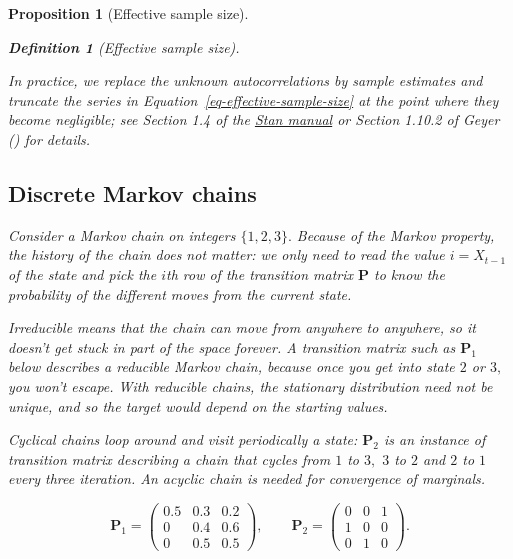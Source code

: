 \documentclass[
  11pt,
  letterpaper,
]{scrbook}
\theoremstyle{definition}
\theoremstyle{plain}
\newtheorem{proposition}{Proposition}[chapter]
\theoremstyle{plain}
\theoremstyle{plain}
\theoremstyle{definition}
\theoremstyle{definition}
\newtheorem{definition}{Definition}[chapter]
\theoremstyle{plain}
\newtheorem{proposition}{Proposition}[chapter]
\theoremstyle{plain}
\theoremstyle{remark}
\begin{document}
\begin{proposition}[Effective sample
size]
\begin{definition}[Effective sample
size]
\end{definition}

In practice, we replace the unknown autocorrelations by sample estimates
and truncate the series in Equation~\ref{eq-effective-sample-size} at
the point where they become negligible; see Section 1.4 of the
\href{https://mc-stan.org/docs/reference-manual/effective-sample-size.html}{Stan
manual} or Section 1.10.2 of Geyer () for
details.

\subsection{Discrete Markov chains}\label{discrete-markov-chains}

Consider a Markov chain on integers \(\{1, 2, 3\}.\) Because of the
Markov property, the history of the chain does not matter: we only need
to read the value \(i=X_{t-1}\) of the state and pick the \(i\)th row of
the transition matrix \(\mathbf{P}\) to know the probability of the
different moves from the current state.

Irreducible means that the chain can move from anywhere to anywhere, so
it doesn't get stuck in part of the space forever. A transition matrix
such as \(\mathbf{P}_1\) below describes a reducible Markov chain,
because once you get into state \(2\) or \(3,\) you won't escape. With
reducible chains, the stationary distribution need not be unique, and so
the target would depend on the starting values.

Cyclical chains loop around and visit periodically a state:
\(\mathbf{P}_2\) is an instance of transition matrix describing a chain
that cycles from \(1\) to \(3,\) \(3\) to \(2\) and \(2\) to \(1\) every
three iteration. An acyclic chain is needed for convergence of
marginals.

\[
\mathbf{P}_1 = \begin{pmatrix}
0.5 & 0.3 & 0.2 \\
0 & 0.4 & 0.6 \\
0 & 0.5 & 0.5
\end{pmatrix},
\qquad
\mathbf{P}_2 = \begin{pmatrix}
0 & 0 & 1 \\
1 & 0 & 0 \\
0 & 1 & 0
\end{pmatrix}.
\]

\begin{figure}[ht!]

\centering{

}
\end{figure}
\end{proposition}
\end{document}
